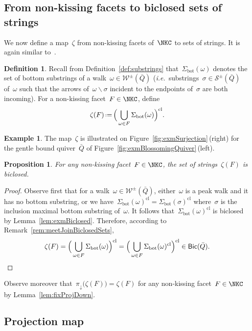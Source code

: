 \documentclass{amsart}
\newtheorem{proposition}[theorem]{Proposition}
\theoremstyle{definition}
\newtheorem{definition}[theorem]{Definition}
\newtheorem{example}[theorem]{Example}
\newcommand{\ssm}{\smallsetminus} %
\newcommand{\eqdef}{\mbox{\,\raisebox{0.2ex}{\scriptsize\ensuremath{\mathrm:}}\ensuremath{=}\,}} %
\newcommand{\fref}[1]{Figure~\ref{#1}} %
\newcommand{\ie}{\textit{i.e.}~} %
\newcommand{\strings}{\mathcal{S}} %
\newcommand{\walks}{\mathcal{W}} %
\newcommand{\bottom}{\mathrm{bot}} %
\newcommand{\closure}[1]{#1^{\mathrm{cl}}} %
\newcommand{\Bicl}[1]{\mathsf{Bic}(#1)} %
\newcommand{\projDown}{\pi_\downarrow} %
\begin{document}
\subsection{From non-kissing facets to biclosed sets of strings}

We now define a map~$\zeta$ from non-kissing facets of~$\NKC$ to sets of strings.
It is again similar to~\cite[Sect.~8]{McConville}.

\begin{definition}
\label{def:zeta}
Recall from Definition~\ref{def:substrings} that~$\Sigma_\bottom(\omega)$ denotes the set of bottom substrings of a walk~$\omega \in \walks^\pm(\bar Q)$ (\ie substrings~$\sigma \in \strings^\pm(\bar Q)$ of~$\omega$ such that the arrows of~$\omega \ssm \sigma$ incident to the endpoints of~$\sigma$ are both incoming).
For a non-kissing facet~$F \in \NKC$, define
\[
\zeta(F) \eqdef \closure{\Big( \bigcup_{\omega \in F} \Sigma_\bottom(\omega) \Big)}.
\]
\end{definition}

\begin{example}
The map~$\zeta$ is illustrated on \fref{fig:exmSurjection}\,(right)  for the gentle bound quiver~$\bar Q$ of \fref{fig:exmBlossomingQuiver}\,(left).
\end{example}

\begin{proposition}
For any non-kissing facet~$F \in \NKC$, the set of strings~$\zeta(F)$ is biclosed.
\end{proposition}

\begin{proof}
Observe first that for a walk~$\omega \in \walks^\pm(\bar Q)$, either~$\omega$ is a peak walk and it has no bottom substring, or we have~$\closure{\Sigma_\bottom(\omega)} = \closure{\Sigma_\bottom(\sigma)}$ where~$\sigma$ is the inclusion maximal bottom substring of~$\omega$.
It follows that~$\closure{\Sigma_\bottom(\omega)}$ is biclosed by Lemma~\ref{lem:exmBiclosed}.
Therefore, according to Remark~\ref{rem:meetJoinBiclosedSets},
\[
\zeta(F) = \closure{\Big( \bigcup_{\omega \in F} \Sigma_\bottom(\omega) \Big)} = \closure{\Big( \bigcup_{\omega \in F} \closure{\Sigma_\bottom(\omega)} \Big)} \in \Bicl{\bar Q}. \qedhere
\]
\end{proof}

Observe moreover that~$\projDown \big( \zeta(F) \big) = \zeta(F)$ for any non-kissing facet~$F \in \NKC$ by Lemma~\ref{lem:fixProjDown}.

\subsection{Projection map}
\end{document}
